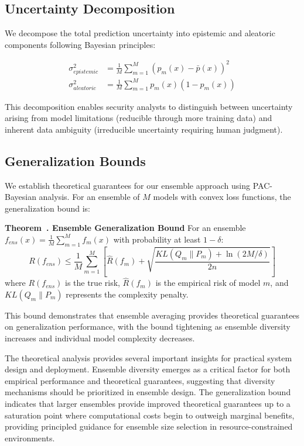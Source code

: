 \documentclass[journal]{IEEEtran}
\newcounter{theorem}
\newenvironment{theorem}[1][]{\refstepcounter{theorem}\par\medskip
   \noindent \textbf{Theorem~\thetheorem. #1} \rmfamily}{\medskip}
\begin{document}
\subsection{Uncertainty Decomposition}

We decompose the total prediction uncertainty into epistemic and aleatoric components following Bayesian principles:

\begin{align}
\sigma_{epistemic}^2 &= \frac{1}{M} \sum_{m=1}^M (p_m(x) - \bar{p}(x))^2 \\
\sigma_{aleatoric}^2 &= \frac{1}{M} \sum_{m=1}^M p_m(x)(1-p_m(x))
\end{align}

This decomposition enables security analysts to distinguish between uncertainty arising from model limitations (reducible through more training data) and inherent data ambiguity (irreducible uncertainty requiring human judgment).

\subsection{Generalization Bounds}

We establish theoretical guarantees for our ensemble approach using PAC-Bayesian analysis. For an ensemble of $M$ models with convex loss functions, the generalization bound is:

\begin{theorem}[Ensemble Generalization Bound]
For an ensemble $f_{ens}(x) = \frac{1}{M} \sum_{m=1}^M f_m(x)$ with probability at least $1-\delta$:
\begin{equation}
R(f_{ens}) \leq \frac{1}{M} \sum_{m=1}^M \left[ \hat{R}(f_m) + \sqrt{\frac{KL(Q_m \| P_m) + \ln(2M/\delta)}{2n}} \right]
\end{equation}
where $R(f_{ens})$ is the true risk, $\hat{R}(f_m)$ is the empirical risk of model $m$, and $KL(Q_m \| P_m)$ represents the complexity penalty.
\end{theorem}

This bound demonstrates that ensemble averaging provides theoretical guarantees on generalization performance, with the bound tightening as ensemble diversity increases and individual model complexity decreases.

The theoretical analysis provides several important insights for practical system design and deployment. Ensemble diversity emerges as a critical factor for both empirical performance and theoretical guarantees, suggesting that diversity mechanisms should be prioritized in ensemble design. The generalization bound indicates that larger ensembles provide improved theoretical guarantees up to a saturation point where computational costs begin to outweigh marginal benefits, providing principled guidance for ensemble size selection in resource-constrained environments.
\end{document}
